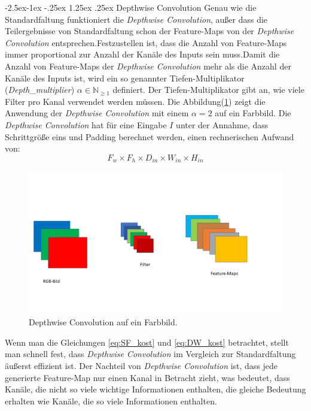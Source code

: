 \documentclass[12pt,a4paper]{scrartcl}
\makeatletter
\numberwithin{equation}{section}
\newcommand{\N}{\mathbb{N}} %
\renewcommand\paragraph{\@startsection{paragraph}{4}{\z@}%
	{-2.5ex\@plus -1ex \@minus -.25ex}%
	{1.25ex \@plus .25ex}%
	{\normalfont\normalsize\bfseries}}
\makeatother
\begin{document}
\paragraph{Depthwise Convolution}\label{Depthwise}
Genau wie die Standardfaltung funktioniert die \textit{Depthwise Convolution}, außer dass die Teilergebnisse von Standardfaltung schon der Feature-Maps von der \textit{Depthwise Convolution} entsprechen.Festzustellen ist, dass die Anzahl von Feature-Maps immer proportional zur Anzahl der Kanäle des Inputs sein muss.Damit die Anzahl von Feature-Maps der \textit{Depthwise Convolution} mehr als die Anzahl der Kanäle des Inputs ist, wird ein so genannter Tiefen-Multiplikator (\textit{Depth\_multiplier}) $\alpha\in \N_{\ge1}$  definiert. Der Tiefen-Multiplikator gibt an, wie viele Filter pro Kanal verwendet werden müssen.  Die Abbildung(\ref{fig:Depthwise_faltung}) zeigt die Anwendung der  \textit{Depthwise Convolution} mit einem  $ \alpha=2 $ auf ein Farbbild.
Die \textit{Depthwise Convolution} hat für eine Eingabe $ I $ unter der Annahme, dass Schrittgröße eins und Padding berechnet werden, einen rechnerischen Aufwand von:
\begin{equation}\label{eq:DW_kost}
	F_w\times F_h \times D_{in}\times W_{in}\times H_{in}
\end{equation}
\begin{figure}[h!]
	\includegraphics[width=\textwidth]{Convolution/Folie2}
	\caption{Depthwise Convolution auf ein Farbbild.}
	\label{fig:Depthwise_faltung}
\end{figure}
Wenn man die Gleichungen \ref{eq:SF_kost} und \ref{eq:DW_kost} betrachtet, stellt man schnell fest, dass \textit{Depthwise Convolution} im Vergleich zur Standardfaltung äußerst effizient ist. Der Nachteil von \textit{Depthwise Convolution} ist, dass jede generierte Feature-Map nur einen Kanal in Betracht zieht, was bedeutet, dass Kanäle, die nicht so viele wichtige Informationen enthalten, die gleiche Bedeutung erhalten wie Kanäle, die so viele Informationen enthalten.  
\end{document}
